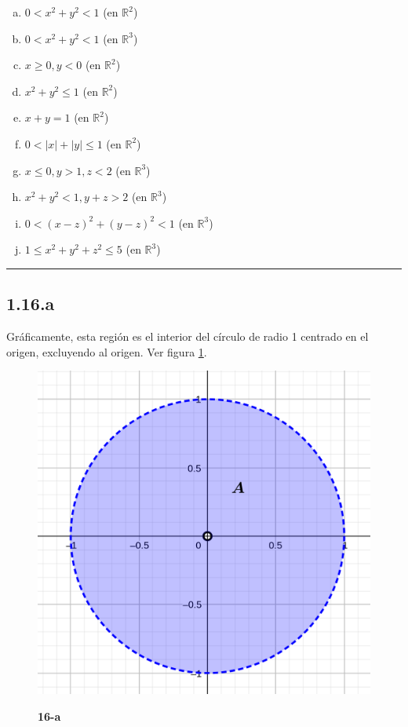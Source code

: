 \documentclass{article}
\renewcommand{\Bbb}{\mathbb}
\begin{document}
\begin{enumerate}[(a)]
\bfseries
\item $0 < x^2 + y^2 < 1$ (en $\Bbb R^2$)

\item $0 < x^2 + y^2 < 1$ (en $\Bbb R^3$)

\item $x \geq 0, y < 0$ (en $\Bbb R^2$)

\item $x^2 + y^2 \leq 1$ (en $\Bbb R^2$)

\item $x + y = 1$ (en $\Bbb R^2$)

\item $0 < |x| + |y| \leq 1$ (en $\Bbb R^2$)

\item $x \leq 0, y > 1, z<2$ (en $\Bbb R^3$)

\item $x^2 + y^2 <1, y + z > 2$ (en $\Bbb R^3$)

\item $0 < (x-z)^2 + (y-z)^2 < 1$ (en $\Bbb R^3$)

\item $1 \leq x^2 + y^2 + z^2 \leq 5$ (en $\Bbb R^3$)
\end{enumerate}
\hrule

\subsection*{1.16.a}
\label{subsec:1.16.a}

Gráficamente, esta región es el interior del círculo de radio 1 centrado en el origen, excluyendo al origen. Ver figura \ref{fig:1-16-a}.

\begin{figure}[ht]
\caption{\textbf{16-a}}
\includegraphics[scale=2.5]{../img/exercises/guide_01/16_a.png} 
\centering
\label{fig:1-16-a}
\end{figure}
\end{document}
